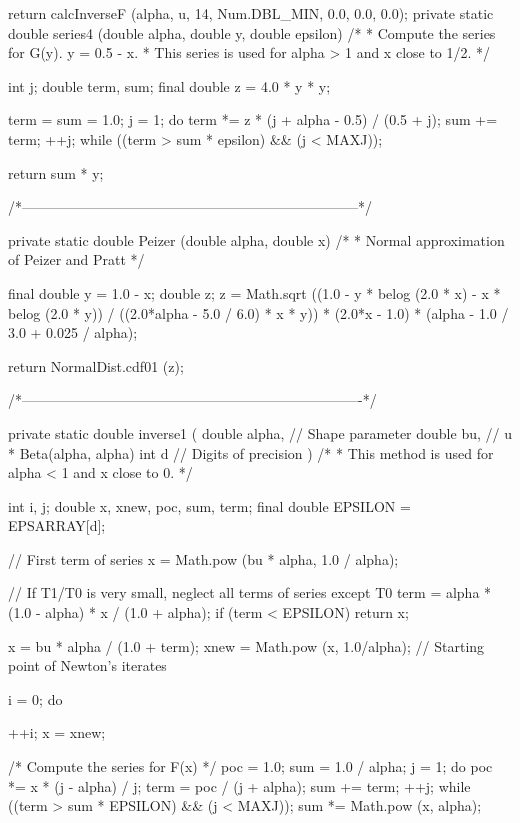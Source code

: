 \begin{code}
\begin{hide} {
      return calcInverseF (alpha, u, 14, Num.DBL_MIN, 0.0, 0.0, 0.0);
   }
   private static double series4 (double alpha, double y, double epsilon)
   /*
    * Compute the series for G(y).   y = 0.5 - x.
    * This series is used for alpha > 1 and x close to 1/2.
    */
   {
      int j;
      double term, sum;
      final double z = 4.0 * y * y;

      term = sum = 1.0;
      j = 1;
      do {
         term *= z * (j + alpha - 0.5) / (0.5 + j);
         sum += term;
         ++j;
      } while ((term > sum * epsilon) && (j < MAXJ));

      return sum * y;
   }

   /*------------------------------------------------------------------------*/

   private static double Peizer (double alpha, double x)
   /*
    * Normal approximation of Peizer and Pratt
    */
   {
      final double y = 1.0 - x;
      double z;
      z = Math.sqrt ((1.0 - y * belog (2.0 * x) -
         x * belog (2.0 * y)) / ((2.0*alpha - 5.0 / 6.0) * x * y)) *
         (2.0*x - 1.0) * (alpha - 1.0 / 3.0 + 0.025 / alpha);

      return NormalDist.cdf01 (z);
   }

   /*-------------------------------------------------------------------------*/

   private static double inverse1 (
      double alpha,                // Shape parameter
      double bu,                   // u * Beta(alpha, alpha)
      int d                        // Digits of precision
      )
   /*
    * This method is used for alpha < 1 and x close to 0.
    */
   {
      int i, j;
      double x, xnew, poc, sum, term;
      final double EPSILON = EPSARRAY[d];

      // First term of series
      x = Math.pow (bu * alpha, 1.0 / alpha);

      // If T1/T0 is very small, neglect all terms of series except T0
      term = alpha * (1.0 - alpha) * x / (1.0 + alpha);
      if (term < EPSILON)
         return x;

      x = bu * alpha / (1.0 + term);
      xnew = Math.pow (x, 1.0/alpha);  // Starting point of Newton's iterates

      i = 0;
      do {
         ++i;
         x = xnew;

         /* Compute the series for F(x) */
         poc = 1.0;
         sum = 1.0 / alpha;
         j = 1;
         do {
            poc *= x * (j - alpha) / j;
            term = poc / (j + alpha);
            sum += term;
            ++j;
         } while ((term > sum * EPSILON) && (j < MAXJ));
         sum *= Math.pow (x, alpha);

}}
\end{hide}
\end{code}
